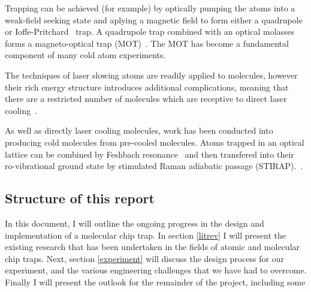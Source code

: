 Trapping can be achieved (for example) by optically pumping the atoms into a
weak-field seeking state and aplying a magnetic field to form either a
quadrupole~\cite{} or Ioffe-Pritchard~\cite{PhysRevLett.51.1336} trap. A
quadrupole trap combined with an optical molasses forms a magneto-optical trap
(MOT)~\cite{PhysRevLett.59.2631}. The MOT has become a fundamental component of
many cold atom experiments.


The techniques of laser slowing atoms are readily applied to molecules, however
their rich energy structure introduces additional complications, meaning that
there are a restricted number of molecules which are receptive to direct laser
cooling~\cite{DiRosa2004}.

As well as directly laser cooling molecules, work has been conducted into
producing cold  molecules from pre-cooled molecules. Atoms trapped in
an optical lattice can be combined by Feshbach
resonance~\cite{PhysRevA.85.032506, PhysRevA.89.033604} and then transfered into
their ro-vibrational ground state by stimulated Raman adiabatic passage
(STIRAP).~\cite{PhysRevLett.113.255301, RevModPhys.70.1003}.

\subsection{Structure of this report}

In this document, I will outline the ongoing progress in the design and
implementation of a molecular chip trap. In section \ref{litrev} I will present
the existing research that has been undertaken in the fields of atomic and
molecular chip traps. Next, section \ref{experiment} will discuss the design
process for our experiment, and the various engineering challenges that we have
had to overcome. Finally I will present the outlook for the remainder of the
project, including some 
